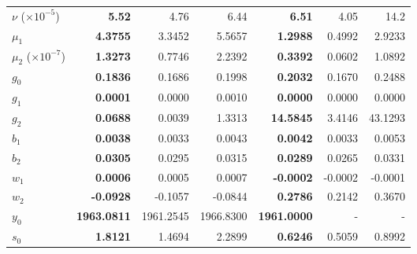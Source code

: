 \begin{table}
\begin{adjustwidth}{-1.5in}{0in}
\begin{tabular}[t]{l>{\bfseries\leavevmode\color{black}}rrr>{\bfseries\leavevmode\color{black}}rrr}
\midrule
$\nu$ ($\times 10^{-5}$) & 5.52 & 4.76 & 6.44 & 6.51 & 4.05 & 14.2 \\
$\mu_1$ & 4.3755 & 3.3452 & 5.5657 & 1.2988 & 0.4992 & 2.9233\\
$\mu_2$ ($\times 10^{-7}$) & 1.3273 & 0.7746 & 2.2392 & 0.3392 & 0.0602 & 1.0892\\
$g_0$ & 0.1836 & 0.1686 & 0.1998 & 0.2032 & 0.1670 & 0.2488\\
$g_1$ & 0.0001 & 0.0000 & 0.0010 & 0.0000 & 0.0000 & 0.0000\\
$g_2$ & 0.0688 & 0.0039 & 1.3313 & 14.5845 & 3.4146 & 43.1293\\
\addlinespace
$b_1$ & 0.0038 & 0.0033 & 0.0043 & 0.0042 & 0.0033 & 0.0053\\
$b_2$ & 0.0305 & 0.0295 & 0.0315 & 0.0289 & 0.0265 & 0.0331\\
$w_1$ & 0.0006 & 0.0005 & 0.0007 & -0.0002 & -0.0002 & -0.0001\\
$w_2$ & -0.0928 & -0.1057 & -0.0844 & 0.2786 & 0.2142 & 0.3670\\
$y_0$ & 1963.0811 & 1961.2545 & 1966.8300 & 1961.0000 & - & - \\
$s_0$ & 1.8121 & 1.4694 & 2.2899 & 0.6246 & 0.5059 & 0.8992\\
\bottomrule
\end{tabular}
\end{adjustwidth}
\end{table}
